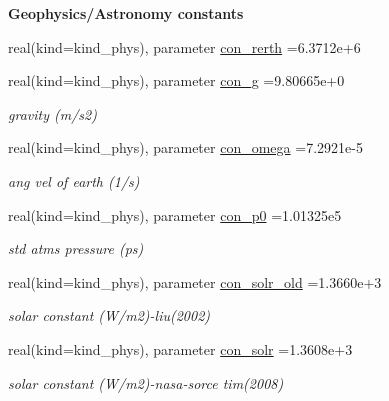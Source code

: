\begin{Indent}{\bf Geophysics/\+Astronomy constants}\par
\begin{DoxyCompactItemize}
\item 
real(kind=kind\+\_\+phys), parameter \hyperlink{namespacephyscons_a45809304b133b2581328b19b36dd47bc}{con\+\_\+rerth} =6.\+3712e+6
\item 
real(kind=kind\+\_\+phys), parameter \hyperlink{namespacephyscons_a7aa20dba53943ce9bcecb2ebef0e308d}{con\+\_\+g} =9.\+80665e+0
\begin{DoxyCompactList}\small\item\em gravity (m/s2) \end{DoxyCompactList}\item 
real(kind=kind\+\_\+phys), parameter \hyperlink{namespacephyscons_a697e780a35d1cc1b3d5144b7c8019d62}{con\+\_\+omega} =7.\+2921e-\/5
\begin{DoxyCompactList}\small\item\em ang vel of earth (1/s) \end{DoxyCompactList}\item 
real(kind=kind\+\_\+phys), parameter \hyperlink{namespacephyscons_a9d081f8ee3735aea4c64b2c8eb5486b8}{con\+\_\+p0} =1.\+01325e5
\begin{DoxyCompactList}\small\item\em std atms pressure (ps) \end{DoxyCompactList}\item 
real(kind=kind\+\_\+phys), parameter \hyperlink{namespacephyscons_a5649a8745fd2e9fb453e6fa235c11039}{con\+\_\+solr\+\_\+old} =1.\+3660e+3
\begin{DoxyCompactList}\small\item\em solar constant (W/m2)-\/liu(2002) \end{DoxyCompactList}\item 
real(kind=kind\+\_\+phys), parameter \hyperlink{namespacephyscons_a146fd04a08d9f5fac3389f105fd81c23}{con\+\_\+solr} =1.\+3608e+3
\begin{DoxyCompactList}\small\item\em solar constant (W/m2)-\/nasa-\/sorce tim(2008) \end{DoxyCompactList}\end{DoxyCompactItemize}
\end{Indent}
